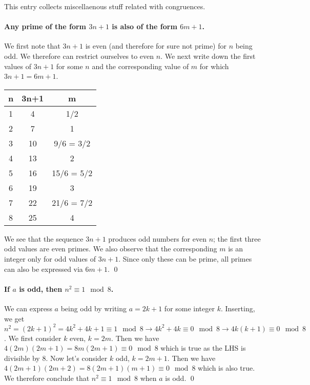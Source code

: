 
This entry collects miscellaenous stuff related with congruences.

\paragraph{Any prime of the form $3n+1$ is also of the form $6m+1$.} We first note that $3n+1$ is even (and therefore for sure not prime) for $n$ being odd. We therefore can restrict ourselves to even $n$. We next write down the first values of $3n+1$ for some $n$ and the corresponding value of $m$ for which $3n+1 = 6m+1$.

\vspace{3mm}

\begin{tabular}{ccc}
    n & 3n+1 & m \\ \hline
    1 & 4    & 1/2 \\
    2 & 7    & 1    \\
    3 & 10   & 9/6 = 3/2 \\
    4 & 13   & 2 \\
    5 & 16   & 15/6 = 5/2 \\
    6 & 19   & 3 \\
    7 & 22   & 21/6 = 7/2 \\
    8 & 25   & 4
\end{tabular}

\vspace{3mm}

We see that the sequence $3n+1$ produces odd numbers for even $n$; the first three odd values are even primes. We also observe that the corresponding $m$ is an integer only for odd values of $3n+1$. Since only these can be prime, all primes can also be expressed via $6m+1$. \qed

\paragraph{If $a$ is odd, then $n^2 \equiv 1 \mod 8$.} We can express $a$ being odd by writing $a = 2k+1$ for some integer $k$. Inserting, we get $n^2 = (2k+1)^2 = 4k^2 + 4k + 1 \equiv 1 \mod 8 \rightarrow 4k^2 + 4k \equiv 0 \mod 8 \rightarrow 4k(k+1) \equiv 0 \mod 8$. We first consider $k$ even, $k = 2m$. Then we have $4(2m)(2m+1) = 8m(2m+1) \equiv 0 \mod 8$ which is true as the LHS is divisible by $8$. Now let's consider $k$ odd, $k = 2m+1$. Then we have $4(2m+1)(2m+2) = 8(2m+1)(m+1) \equiv 0 \mod 8$ which is also true. We therefore conclude that $n^2 \equiv 1 \mod 8$ when $a$ is odd. \qed

